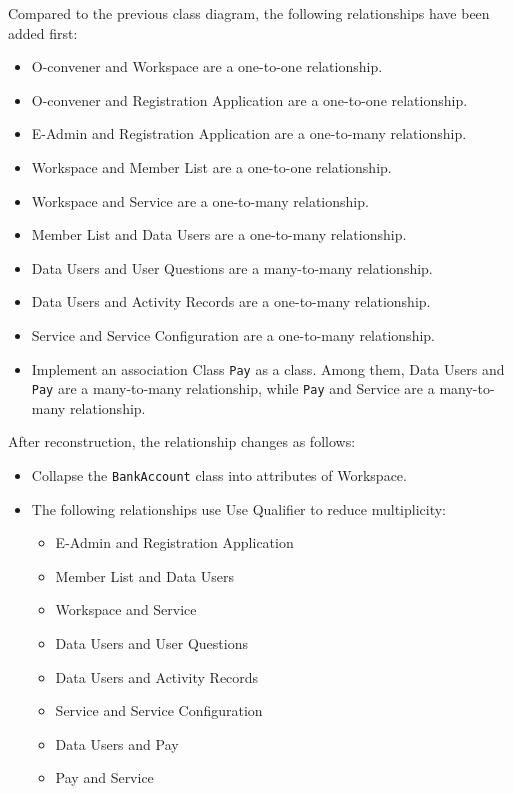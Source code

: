 Compared to the previous class diagram, the following relationships have been added first:
\begin{itemize}
    \item O-convener and Workspace are a one-to-one relationship.
    \item O-convener and Registration Application are a one-to-one relationship.
    \item E-Admin and Registration Application are a one-to-many relationship.
    \item Workspace and Member List are a one-to-one relationship.
    \item Workspace and Service are a one-to-many relationship.
    \item Member List and Data Users are a one-to-many relationship.
    \item Data Users and User Questions are a many-to-many relationship.
    \item Data Users and Activity Records are a one-to-many relationship.
    \item Service and Service Configuration are a one-to-many relationship.
    \item Implement an association Class \texttt{Pay} as a class. Among them, Data Users and \texttt{Pay} are a many-to-many relationship, while \texttt{Pay} and Service are a many-to-many relationship.
\end{itemize}

After reconstruction, the relationship changes as follows:
\begin{itemize}
    \item Collapse the \texttt{BankAccount} class into attributes of Workspace.
    \item The following relationships use Use Qualifier to reduce multiplicity:
    \begin{itemize}
        \item E-Admin and Registration Application
        \item Member List and Data Users
        \item Workspace and Service
        \item Data Users and User Questions
        \item Data Users and Activity Records
        \item Service and Service Configuration
        \item Data Users and Pay
        \item Pay and Service
    \end{itemize}
\end{itemize}


